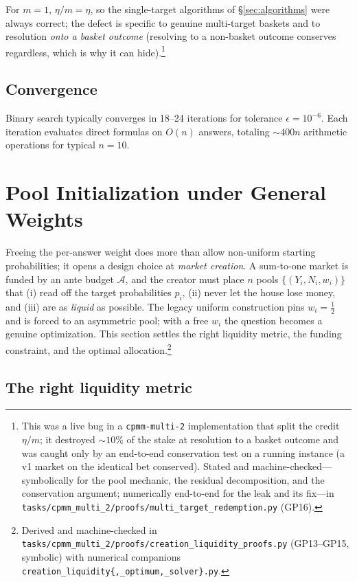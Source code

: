 \documentclass[11pt]{article}
\begin{document}
For $m = 1$, $\eta/m = \eta$, so the single-target algorithms of \S\ref{sec:algorithms} were always correct; the defect is specific to genuine multi-target baskets and to resolution \emph{onto a basket outcome} (resolving to a non-basket outcome conserves regardless, which is why it can hide).\footnote{This was a live bug in a \texttt{cpmm-multi-2} implementation that split the credit $\eta/m$; it destroyed ${\sim}10\%$ of the stake at resolution to a basket outcome and was caught only by an end-to-end conservation test on a running instance (a v1 market on the identical bet conserved). Stated and machine-checked---symbolically for the pool mechanic, the residual decomposition, and the conservation argument; numerically end-to-end for the leak and its fix---in \texttt{tasks/cpmm\_multi\_2/proofs/multi\_target\_redemption.py} (GP16).}

\subsection{Convergence}

Binary search typically converges in 18--24 iterations for tolerance $\epsilon = 10^{-6}$. Each iteration evaluates direct formulas on $O(n)$ answers, totaling $\sim 400n$ arithmetic operations for typical $n = 10$.

\section{Pool Initialization under General Weights}
\label{sec:creation-liquidity}

Freeing the per-answer weight does more than allow non-uniform starting probabilities; it opens a design choice at \emph{market creation}. A sum-to-one market is funded by an ante budget $\mathcal{A}$, and the creator must place $n$ pools $\{(Y_i, N_i, w_i)\}$ that (i) read off the target probabilities $p_i$, (ii) never let the house lose money, and (iii) are as \emph{liquid} as possible. The legacy uniform construction pins $w_i = \tfrac12$ and is forced to an asymmetric pool; with a free $w_i$ the question becomes a genuine optimization. This section settles the right liquidity metric, the funding constraint, and the optimal allocation.\footnote{Derived and machine-checked in \texttt{tasks/cpmm\_multi\_2/proofs/creation\_liquidity\_proofs.py} (GP13--GP15, symbolic) with numerical companions \texttt{creation\_liquidity\{,\_optimum,\_solver\}.py}.}

\subsection{The right liquidity metric}
\end{document}
